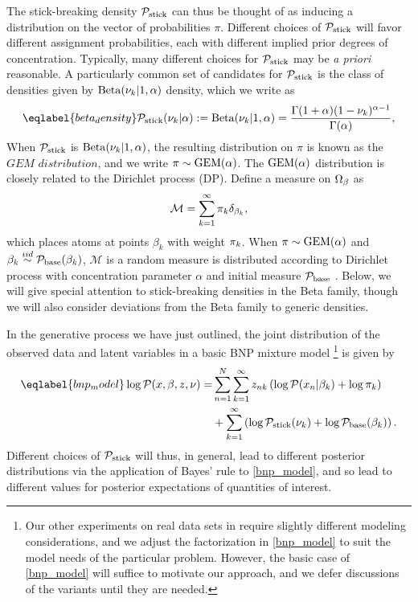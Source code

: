 The stick-breaking density $\mathcal{P}_{\mathrm{stick}}$ can thus be thought of as inducing a
distribution on the vector of probabilities $\pi$.  Different choices of
$\mathcal{P}_{\mathrm{stick}}$ will favor different assignment probabilities, each with different
implied prior degrees of concentration.
%
Typically, many different choices for $\mathcal{P}_{\mathrm{stick}}$ may be {\em a priori}
reasonable.  A particularly common set of candidates for $\mathcal{P}_{\mathrm{stick}}$ is the class
of densities given by $\mathrm{Beta}(\nu_{k} \vert 1, \alpha)$ density, which we
write as
%
\begin{align}\eqlabel{beta_density}
%
\pstick(\nuk \vert \alpha) :=
\mathrm{Beta}(\nuk \vert 1, \alpha) =
    \frac{\Gamma(1 + \alpha) (1 - \nuk)^{\alpha - 1}}
         {\Gamma(\alpha)},
%
\end{align}
%
When $\mathcal{P}_{\mathrm{stick}}$ is $\mathrm{Beta}(\nu_{k} \vert 1, \alpha)$, the resulting
distribution on $\pi$ is known as the $\textit{GEM distribution}$, and we write
$\pi \sim \mathrm{GEM}(\alpha)$.
%
The $\mathrm{GEM}(\alpha)$ distribution is closely related to the Dirichlet process (DP).
Define a measure on $\Omega_{\beta}$ as
%
\begin{align*}
  \mathcal{M} = \sum_{k = 1}^\infty \pi_k\delta_{\beta_k},
\end{align*}
%
which places atoms at points $\beta_k$ with weight $\pi_k$. When $\pi \sim
\mathrm{GEM}(\alpha)$ and $\beta_k \overset{iid}{\sim} \mathcal{P}_{\mathrm{base}}(\beta_k)$, $\mathcal{M}$
is a random measure is distributed according to Dirichlet process with
concentration parameter $\alpha$ and initial measure $\mathcal{P}_{\mathrm{base}}$
\citep{ferguson:1973:bayesian, sethuraman:1994:constructivedp}. Below, we will
give special attention to stick-breaking densities in the Beta family, though we
will also consider deviations from the Beta family to generic densities.

In the generative process we have just outlined, the joint distribution of the
observed data and latent variables in a basic BNP mixture model
%
\footnote{ Our other experiments on real data sets in  require slightly different modeling considerations, and we
adjust the factorization in \eqref{bnp_model} to suit the model needs of the
particular problem.  However, the basic case of \eqref{bnp_model} will suffice
to motivate our approach, and we defer discussions of the variants until they
are needed.}
%
is given by
%
\begin{align}\eqlabel{bnp_model}
%
\logp(\x, \beta, \z, \nu) =&
\sum_{n=1}^N \sum_{k=1}^{\infty}
    \z_{\n\k} \left(
        \logp(\x_n \vert \beta_\k) + \log \pi_\k
    \right)
\nonumber\\
   & +
    \sum_{k=1}^{\infty} \left(
        \log \pstick(\nuk) + \log \pbetaprior(\beta_\k)
    \right).
%
\end{align}
%
Different choices of $\mathcal{P}_{\mathrm{stick}}$ will thus, in general, lead to different
posterior distributions via the application of Bayes' rule to \eqref{bnp_model},
and so lead to different values for posterior expectations of quantities of
interest.

